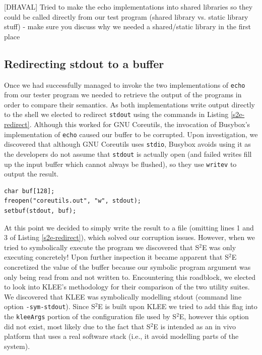 \documentclass[conference]{IEEEtran}
\begin{document}
[DHAVAL] Tried to make the echo implementations into shared libraries so they could be called directly from our test program (shared library vs. static library stuff) - make sure you discuss why we needed a shared/static library in the first place

\subsection{Redirecting stdout to a buffer}

Once we had successfully managed to invoke the two implementations of {\tt echo} from our tester program we needed to retrieve the output of the programs in order to compare their semantics. As both implementations write output directly to the shell we elected to redirect {\tt stdout} using the commands in Listing \ref{s2e-redirect}. Although this worked for GNU Coreutils, the invocation of Busybox's implementation of {\tt echo} caused our buffer to be corrupted. Upon investigation, we discovered that although GNU Coreutils uses {\tt stdio}, Busybox avoids using it as the developers do not assume that {\tt stdout} is actually open (and failed writes fill up the input buffer which cannot always be flushed), so they use {\tt writev} to output the result. \\ 

\begin{lstlisting}[style=C, label=s2e-redirect, abovecaptionskip=2ex, captionpos=b, caption={Code snippet for redirecting stdout to a buffer}]
char buf[128];
freopen("coreutils.out", "w", stdout);
setbuf(stdout, buf);
\end{lstlisting}

At this point we decided to simply write the result to a file (omitting lines 1 and 3 of Listing \ref{s2e-redirect}), which solved our corruption issues. However, when we tried to symbolically execute the program we discovered that S$^2$E was only executing concretely! Upon further inspection it became apparent that S$^2$E concretized the value of the buffer because our symbolic program argument was only being read from and not written to. Encountering this roadblock, we elected to look into KLEE's methodology for their comparison of the two utility suites. We discovered that KLEE was symbolically modelling stdout (command line option {\tt -sym-stdout}). Since S$^2$E is built upon KLEE we tried to add this flag into the {\tt kleeArgs} portion of the configuration file used by S$^2$E, however this option did not exist, most likely due to the fact that S$^2$E is intended as an in vivo platform that uses a real software stack (i.e., it avoid modelling parts of the system).
\end{document}
